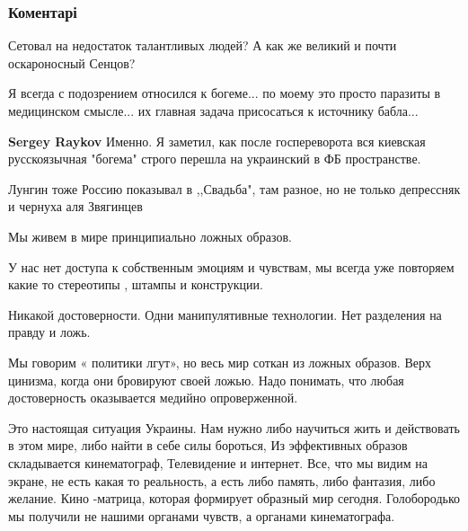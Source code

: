  
 
 
 
 
\subsubsection{Коментарі}
\label{sec:09_11_2021.fb.zharkih_denis.1.princip_bogemy.cmt}

\begin{itemize} %
Сетовал на недостаток талантливых людей? А как же великий и почти оскароносный Сенцов?


Я всегда с подозрением относился к богеме... по моему это просто паразиты в
медицинском смысле... их главная задача присосаться к источнику бабла...

\begin{itemize} %
\textbf{Sergey Raykov} Именно. Я заметил, как после госпереворота вся киевская русскоязычная "богема" строго перешла на украинский в ФБ пространстве.
\end{itemize} %


Лунгин тоже Россию показывал в ,,Свадьба", там разное, но не только депрессняк и чернуха аля Звягинцев


Мы живем в мире принципиально ложных образов.

У нас нет доступа к собственным эмоциям и чувствам, мы всегда уже повторяем
какие то стереотипы , штампы и конструкции.

Никакой достоверности. Одни манипулятивные технологии. Нет разделения на правду
и ложь.

Мы говорим « политики лгут», но весь мир соткан из ложных образов. Верх
цинизма, когда они бровируют своей ложью. Надо понимать, что любая
достоверность оказывается медийно опроверженной.

Это настоящая ситуация Украины. Нам нужно либо научиться жить и действовать в
этом мире, либо найти в себе силы бороться, Из эффективных образов складывается
кинематограф, Телевидение и интернет. Все, что мы видим на экране, не есть
какая то реальность, а есть либо память, либо фантазия, либо желание. Кино
-матрица, которая формирует образный мир сегодня. Голобородько
мы получили не нашими органами чувств, а органами кинематографа.


\end{itemize}
